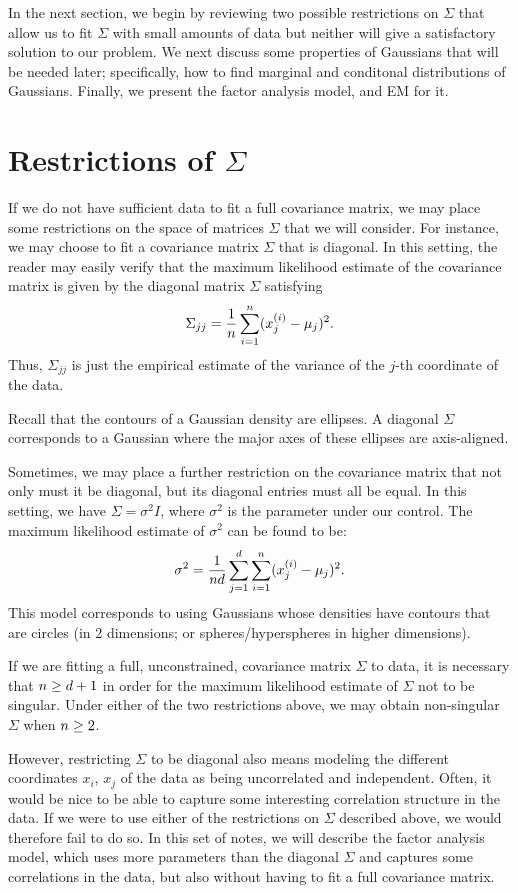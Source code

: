 \documentclass{article}
\begin{document}
In the next section, we begin by reviewing two possible restrictions on $\Sigma$
that allow us to fit $\Sigma$ with small amounts of data but neither will give a
satisfactory solution to our problem.  We next discuss some
properties of Gaussians that will be needed later; specifically, how to find marginal
and conditonal distributions of Gaussians.  Finally, we present the factor analysis model,
and EM for it.


\section{Restrictions of $\Sigma$}

If we do not have sufficient data to fit a full covariance matrix, we may place some
restrictions on the space of matrices $\Sigma$ that we will consider.  For instance,
we may
choose to fit a covariance matrix $\Sigma$ that is diagonal.  In this setting, the reader
may easily verify that the maximum likelihood estimate of the covariance matrix is given by the
diagonal matrix $\Sigma$ satisfying
\[
\Sigma_{jj} = \frac{1}{{n}}\sum_{i=1}^{n} (x_j^{(i)} -\mu_j)^2.
\]
Thus, $\Sigma_{jj}$ is just the empirical estimate of the variance of the $j$-th coordinate
of the data.

Recall that the contours of a Gaussian density are ellipses.  A diagonal $\Sigma$ corresponds
to a Gaussian where the major axes of these ellipses are axis-aligned.

Sometimes, we may place a further restriction on the covariance matrix that not only
must it be diagonal, but its diagonal entries must all be equal.  In this setting,
we have $\Sigma = \sigma^2I$, where $\sigma^2$ is the parameter under our control.
The maximum likelihood estimate of $\sigma^2$ can be found to be:
\[
\sigma^2 = \frac{1}{{n} {d}} \sum_{j=1}^{d} \sum_{i=1}^{n} (x_j^{(i)} -\mu_j)^2.
\]
This model corresponds to using Gaussians whose densities have contours that are
circles (in 2 dimensions; or spheres/hyperspheres in higher dimensions).

If we are fitting a full, unconstrained, covariance matrix $\Sigma$ to data, it is
necessary that ${n} \geq {d}+1$ in order for the maximum likelihood estimate of $\Sigma$ not
to be singular.  Under either of the two restrictions above, we may obtain non-singular
$\Sigma$ when ${n} \geq 2$.

However, restricting $\Sigma$ to be diagonal also means modeling the different coordinates
$x_i$, $x_j$ of the data as being uncorrelated and independent.  Often, it would be nice to
be able to capture some interesting correlation structure in the data.  If we were to use
either of the restrictions on $\Sigma$ described above, we would therefore
fail to do so.  In this set of notes, we will describe the factor analysis model,
which uses more parameters than the diagonal $\Sigma$ and captures some correlations
in the data, but also without having to fit a full covariance matrix.
\end{document}
